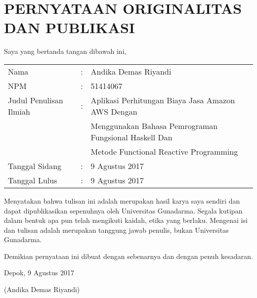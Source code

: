\documentclass[pi.tex]{subfile}
\begin{document}
\chapter*{PERNYATAAN ORIGINALITAS DAN PUBLIKASI}



Saya yang bertanda tangan dibawah ini,
\vspace{0.5cm}

\begin{tabular}{lcl}
  Nama &:& Andika Demas Riyandi \\
  NPM &:& 51414067 \\
  Judul Penulisan Ilmiah &:& Aplikasi Perhitungan Biaya Jasa Amazon AWS Dengan \\ & & Menggunakan Bahasa Pemrograman Fungsional Haskell Dan \\ & & Metode Functional Reactive Programming \\
  Tanggal Sidang &:& 9 Agustus 2017 \\
  Tanggal Lulus &:& 9 Agustus 2017 \\
\end{tabular}\vspace*{1\baselineskip}


Menyatakan bahwa tulisan ini adalah merupakan hasil karya saya sendiri dan dapat dipublikasikan sepenuhnya oleh Universitas Gunadarma. Segala kutipan dalam bentuk apa pun telah mengikuti kaidah, etika yang berlaku. Mengenai isi dan tulisan adalah merupakan tanggung jawab penulis, bukan Universitas Gunadarma.

Demikian pernyataan ini dibuat dengan sebenarnya dan dengan penuh kesadaran.\\

\begin{flushright}
  
 Depok, 9 Agustus 2017
 
\vspace{2cm}

(Andika Demas Riyandi)
\end{flushright}
\end{document}
